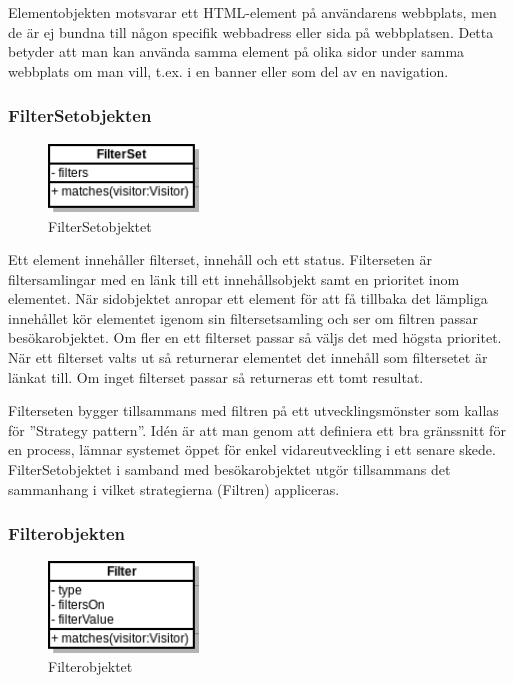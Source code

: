 Elementobjekten motsvarar ett HTML-element på användarens webbplats, men de är ej bundna till någon specifik webbadress eller sida på webbplatsen. Detta betyder att man kan använda samma element på olika sidor under samma webbplats om man vill, t.ex. i en banner eller som del av en navigation.

\subsubsection{FilterSetobjekten}

\begin{figure}[h!]
\centering
\includegraphics[width=40mm]{assets/images/umlFilterSet.png}
\caption{FilterSetobjektet}
\label{filtersetuml}
\end{figure}

Ett element innehåller filterset, innehåll och ett status. Filterseten är filtersamlingar med en länk till ett innehållsobjekt samt en prioritet inom elementet. När sidobjektet anropar ett element för att få tillbaka det lämpliga innehållet kör elementet igenom sin filtersetsamling och ser om filtren passar besökarobjektet. Om fler en ett filterset passar så väljs det med högsta prioritet. När ett filterset valts ut så returnerar elementet det innehåll som filtersetet är länkat till. Om inget filterset passar så returneras ett tomt resultat.

Filterseten bygger tillsammans med filtren på ett utvecklingsmönster som kallas för ''Strategy pattern''. Idén är att man genom att definiera ett bra gränssnitt för en process, lämnar systemet öppet för enkel vidareutveckling i ett senare skede. \citep[s. 349]{gof} FilterSetobjektet i samband med besökarobjektet utgör tillsammans det sammanhang i vilket strategierna (Filtren) appliceras.

\subsubsection{Filterobjekten}

\begin{figure}[h!]
\centering
\includegraphics[width=40mm]{assets/images/umlFilter.png}
\caption{Filterobjektet}
\label{filteruml}
\end{figure}

